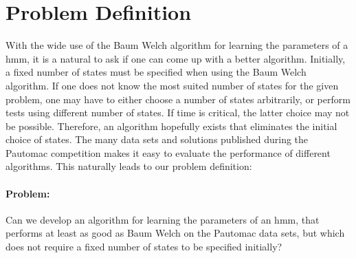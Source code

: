 \section{Problem Definition}

With the wide use of the Baum Welch algorithm for learning the parameters of a \gls{hmm}, it is a natural to ask if one can come up with a better algorithm. Initially, a fixed number of states must be specified when using the Baum Welch algorithm.
If one does not know the most suited number of states for the given problem, one may have to either choose a number of states arbitrarily, or perform tests using different number of states. If time is critical, the latter choice may not be possible. Therefore, an algorithm hopefully exists that eliminates the initial choice of states.
The many data sets and solutions published during the Pautomac competition makes it easy to evaluate the performance of different algorithms.
This naturally leads to our problem definition:

\paragraph{Problem:}

Can we develop an algorithm for learning the parameters of an \gls{hmm}, that performs at least as good as Baum Welch on the Pautomac data sets, but which does not require a fixed number of states to be specified initially?
